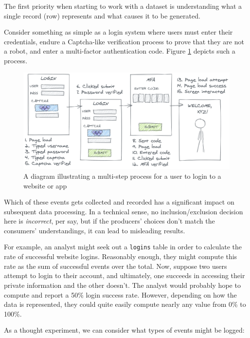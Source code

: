 \documentclass[
]{krantz}
\begin{document}
The first priority when starting to work with a dataset is understanding what a single record (row) represents and what causes it to be generated.

Consider something as simple as a login system where users must enter their credentials, endure a Captcha-like verification process to prove that they are not a robot, and enter a multi-factor authentication code. Figure \ref{fig:login-log} depicts such a process.

\begin{figure}

{\centering \includegraphics[width=0.9\linewidth]{figures/data-dall/login-log} 

}

\caption{A diagram illustrating a multi-step process for a user to login to a website or app}\label{fig:login-log}
\end{figure}

Which of these events gets collected and recorded has a significant impact on subsequent data processing.
In a technical sense, no inclusion/exclusion decision here is \emph{incorrect}, per say, but if the producers' choices don't match the consumers' understandings, it can lead to misleading results.

For example, an analyst might seek out a \texttt{logins} table in order to calculate the rate of successful website logins.
Reasonably enough, they might compute this rate as the sum of successful events over the total.
Now, suppose two users attempt to login to their account, and ultimately, one succeeds in accessing their private information and the other doesn't.
The analyst would probably hope to compute and report a 50\% login success rate. However, depending on how the data is represented, they could quite easily compute nearly any value from 0\% to 100\%.

As a thought experiment, we can consider what types of events might be logged:
\end{document}
